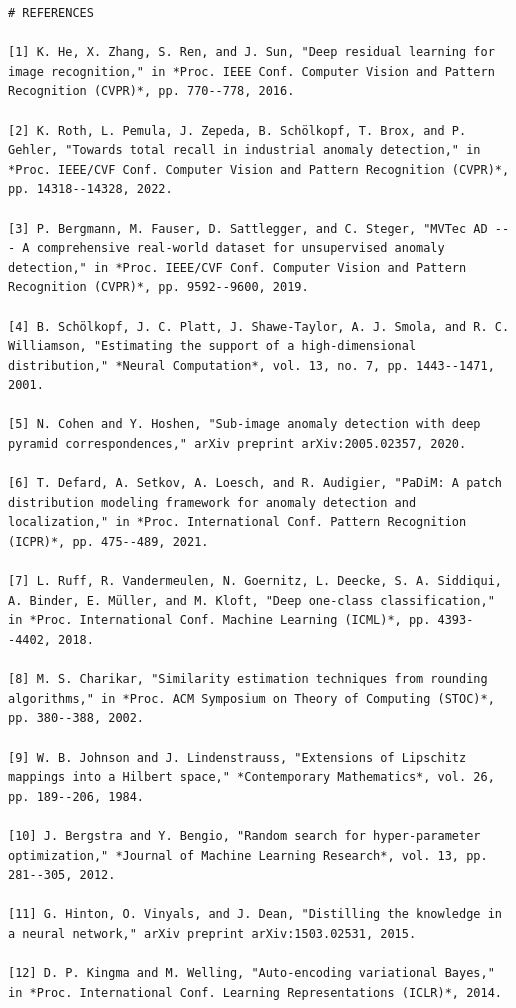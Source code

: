 \documentclass[12pt,a4paper,oneside]{report}
\begin{document}
\begin{verbatim}
# REFERENCES

[1] K. He, X. Zhang, S. Ren, and J. Sun, "Deep residual learning for image recognition," in *Proc. IEEE Conf. Computer Vision and Pattern Recognition (CVPR)*, pp. 770--778, 2016.

[2] K. Roth, L. Pemula, J. Zepeda, B. Schölkopf, T. Brox, and P. Gehler, "Towards total recall in industrial anomaly detection," in *Proc. IEEE/CVF Conf. Computer Vision and Pattern Recognition (CVPR)*, pp. 14318--14328, 2022.

[3] P. Bergmann, M. Fauser, D. Sattlegger, and C. Steger, "MVTec AD --- A comprehensive real-world dataset for unsupervised anomaly detection," in *Proc. IEEE/CVF Conf. Computer Vision and Pattern Recognition (CVPR)*, pp. 9592--9600, 2019.

[4] B. Schölkopf, J. C. Platt, J. Shawe-Taylor, A. J. Smola, and R. C. Williamson, "Estimating the support of a high-dimensional distribution," *Neural Computation*, vol. 13, no. 7, pp. 1443--1471, 2001.

[5] N. Cohen and Y. Hoshen, "Sub-image anomaly detection with deep pyramid correspondences," arXiv preprint arXiv:2005.02357, 2020.

[6] T. Defard, A. Setkov, A. Loesch, and R. Audigier, "PaDiM: A patch distribution modeling framework for anomaly detection and localization," in *Proc. International Conf. Pattern Recognition (ICPR)*, pp. 475--489, 2021.

[7] L. Ruff, R. Vandermeulen, N. Goernitz, L. Deecke, S. A. Siddiqui, A. Binder, E. Müller, and M. Kloft, "Deep one-class classification," in *Proc. International Conf. Machine Learning (ICML)*, pp. 4393--4402, 2018.

[8] M. S. Charikar, "Similarity estimation techniques from rounding algorithms," in *Proc. ACM Symposium on Theory of Computing (STOC)*, pp. 380--388, 2002.

[9] W. B. Johnson and J. Lindenstrauss, "Extensions of Lipschitz mappings into a Hilbert space," *Contemporary Mathematics*, vol. 26, pp. 189--206, 1984.

[10] J. Bergstra and Y. Bengio, "Random search for hyper-parameter optimization," *Journal of Machine Learning Research*, vol. 13, pp. 281--305, 2012.

[11] G. Hinton, O. Vinyals, and J. Dean, "Distilling the knowledge in a neural network," arXiv preprint arXiv:1503.02531, 2015.

[12] D. P. Kingma and M. Welling, "Auto-encoding variational Bayes," in *Proc. International Conf. Learning Representations (ICLR)*, 2014.


\end{verbatim}
\end{document}
